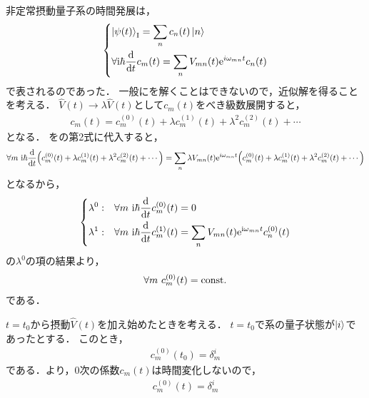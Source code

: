 \documentclass{report}
\begin{document}
  非定常摂動量子系の時間発展は，
  \begin{align}
    \begin{dcases}
      \ket{\psi(t)}_{\mathrm{I}} = \sum_{n}c_n(t)\ket{n} \label{non-steady-quantum-system-re} \\
      \forall \mathrm{i}\hbar\dv{t}c_m(t) = \sum_{n}V_{mn}(t)\mathrm{e}^{i\omega_{mn}t}c_n(t)
    \end{dcases}
  \end{align}
  で表されるのであった．
  一般にを解くことはできないので，近似解を得ることを考える．
  $\hat{V}(t) \to \lambda\hat{V}(t)$として$c_m(t)$をべき級数展開すると，
  \begin{align}
    c_m(t) = c_m^{(0)}(t) + \lambda c_m^{(1)}(t) + \lambda^2c_m^{(2)}(t) + \cdots\label{cnt-taylor-expantion}
  \end{align}
  となる．
  をの第2式に代入すると，
  \begin{align}
    \forall m\  \mathrm{i}\hbar\dv{t}\qty(c_m^{(0)}(t) + \lambda c_m^{(1)}(t) + \lambda^2c_m^{(2)}(t) + \cdots) = \sum_{n}\lambda V_{mn}(t)\mathrm{e}^{i\omega_{mn}t}\qty(c_m^{(0)}(t) + \lambda c_m^{(1)}(t) + \lambda^2c_m^{(2)}(t) + \cdots)
  \end{align}
  となるから，
  \begin{align}
    \begin{dcases}
      \lambda^0 :& \forall m\ \mathrm{i}\hbar\dv{t}c_m^{(0)}(t) = 0 \label{non-steady-quantum-system-re-expantion} \\ 
      \lambda^1 :& \forall m\ \mathrm{i}\hbar\dv{t}c_m^{(1)}(t) = \sum_{n}V_{mn}(t)\mathrm{e}^{\mathrm{i}\omega_{mn}t}c_n^{(0)}(t)
    \end{dcases}
  \end{align}
  の$\lambda^0$の項の結果より，
  \begin{align}
    \forall m\ c_m^{(0)}(t) = \mathrm{const.}\label{non-steady-quantum-system-re-const}
  \end{align}
  である．
  \par
  $t = t_0$から摂動$\hat{V}(t)$を加え始めたときを考える．
  $t = t_0$で系の量子状態が$\ket{i}$であったとする．
  このとき，
  \begin{align}
    c_m^{(0)}(t_0) = \delta_m^i
  \end{align}
  である．より，0次の係数$c_m(t)$は時間変化しないので，
  \begin{align}
    c_m^{(0)}(t) = \delta_m^i
  \end{align}
\end{document}
